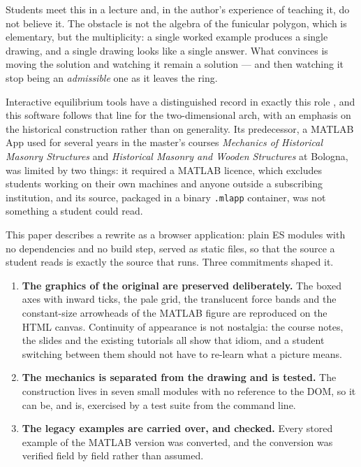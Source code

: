 \documentclass[final,3p,times,twocolumn]{elsarticle}
\begin{document}
Students meet this in a lecture and, in the author's experience of teaching it,
do not believe it. The obstacle is not the algebra of the funicular polygon,
which is elementary, but the multiplicity: a single worked example produces a
single drawing, and a single drawing looks like a single answer. What convinces
is moving the solution and watching it remain a solution --- and then watching
it stop being an \emph{admissible} one as it leaves the ring.

Interactive equilibrium tools have a distinguished record in exactly this role
\cite{ODwyer1999,Block2006,Block2007}, and this software follows that line for
the two-dimensional arch, with an emphasis on the historical construction
rather than on generality. Its predecessor, a MATLAB App used for several years
in the master's courses \emph{Mechanics of Historical Masonry Structures} and
\emph{Historical Masonry and Wooden Structures} at Bologna, was limited by two
things: it required a MATLAB licence, which excludes students working on their
own machines and anyone outside a subscribing institution, and its source,
packaged in a binary \texttt{.mlapp} container, was not something a student
could read.

This paper describes a rewrite as a browser application: plain ES modules with
no dependencies and no build step, served as static files, so that the source
a student reads is exactly the source that runs. Three commitments shaped it.

\begin{enumerate}
\item \textbf{The graphics of the original are preserved deliberately.} The
  boxed axes with inward ticks, the pale grid, the translucent force bands and
  the constant-size arrowheads of the MATLAB figure are reproduced on the HTML
  canvas. Continuity of appearance is not nostalgia: the course notes, the
  slides and the existing tutorials all show that idiom, and a student
  switching between them should not have to re-learn what a picture means.
\item \textbf{The mechanics is separated from the drawing and is tested.} The
  construction lives in seven small modules with no reference to the DOM, so
  it can be, and is, exercised by a test suite from the command line.
\item \textbf{The legacy examples are carried over, and checked.} Every stored
  example of the MATLAB version was converted, and the conversion was verified
  field by field rather than assumed.
\end{enumerate}
\end{document}
